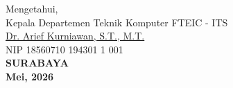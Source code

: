 \begin{center}
  Mengetahui,\\
  Kepala Departemen Teknik Komputer FTEIC - ITS\\
  \vspace{10ex}
  \underline{Dr. Arief Kurniawan, S.T., M.T. }\\
  NIP 18560710 194301 1 001\\
  \vspace{10ex}
  \textbf{SURABAYA} \\
  \textbf{Mei, 2026}
\end{center}
\endgroup

